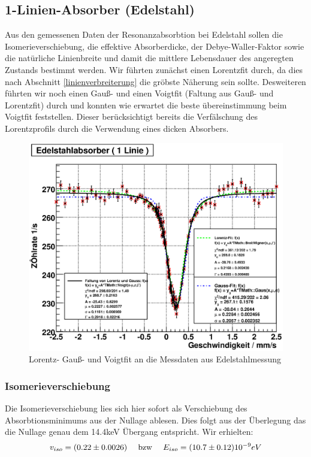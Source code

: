 \documentclass[12pt]{article}
\begin{document}
\subsection{1-Linien-Absorber (Edelstahl)}
Aus den gemessenen Daten der Resonanzabsorbtion bei Edelstahl sollen die Isomerieverschiebung, die effektive Absorberdicke, der Debye-Waller-Faktor
sowie die natürliche Linienbreite und damit die mittlere Lebensdauer des angeregten Zustands bestimmt werden. Wir führten zunächst einen Lorentzfit
durch, da dies nach Abschnitt \ref{linienverbreiterung} die gröbste Näherung sein sollte. Desweiteren führten wir noch einen Gauß- und einen Voigtfit
(Faltung aus Gauß- und Lorentzfit) durch und konnten wie erwartet die beste übereinstimmung beim Voigtfit feststellen. Dieser berücksichtigt bereits 
die Verfälschung des Lorentzprofils durch die Verwendung eines dicken Absorbers.
\begin{figure}[H]
 \includegraphics[width=0.9\linewidth]{pictures/stahl.eps}
 \caption{Lorentz- Gauß- und Voigtfit an die Messdaten aus Edelstahlmessung}
\end{figure}

\subsubsection{Isomerieverschiebung}
Die Isomerieverschiebung lies sich hier sofort als Verschiebung des Absorbtionsminimums aus der Nullage ablesen. Dies folgt aus der Überlegung das 
die Nullage genau dem 14.4keV Übergang entspricht. Wir erhielten:
\begin{align*}
 v_{iso} = (0.22\pm 0.0026) \hspace{10pt} \textnormal{ bzw } \hspace{10pt} E_{iso} = (10.7 \pm 0.12) 10^{-9} eV
\end{align*}
\end{document}
